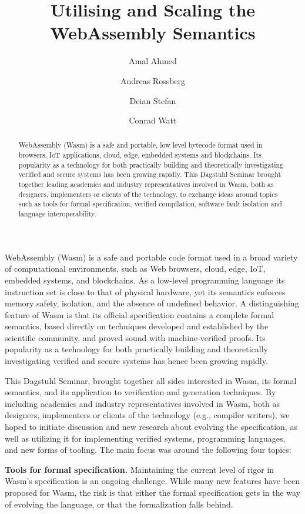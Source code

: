 \documentclass[a4paper,UKenglish]{dagrep-v2018}
\title{Utilising and Scaling the WebAssembly Semantics}
\author[1]{Amal Ahmed}
\author[2]{Andreas Rossberg}
\author[3]{Deian Stefan}
\author[4]{Conrad Watt}
\affil[1]{Northeastern University - Boston, US, \texttt{amal@ccs.neu.edu}}
\affil[2]{München, DE, \texttt{rossberg@mpi-sws.org}}
\affil[3]{University of California - San Diego, US, \texttt{deian@cs.ucsd.edu}}
\affil[4]{Nanyang TU - Singapore, SG, \texttt{conrad.watt@cl.cam.ac.uk}}
\begin{document}
\maketitle

\begin{abstract}
WebAssembly (Wasm) is a safe and portable, low level bytecode format used in browsers, IoT applications, cloud, edge, embedded systems and blockchains. Its popularity as a technology for both practically building and theoretically investigating verified and secure systems has been growing rapidly. This Dagstuhl Seminar brought together leading academics and industry representatives involved in Wasm, both as designers, implementers or clients of the technology, to exchange ideas around topics such as tools for formal specification, verified compilation, software fault isolation and language interoperability. 
\end{abstract}

\license
{}

WebAssembly (Wasm) is a safe and portable code format used in a broad variety of computational environments, such as Web browsers, cloud, edge, IoT, embedded systems, and blockchains. As a low-level programming language its instruction set is close to that of physical hardware, yet its semantics enforces memory safety, isolation, and the absence of undefined behavior. A distinguishing feature of Wasm is that its official specification contains a complete formal semantics, based directly on techniques developed and established by the scientific community, and proved sound with machine-verified proofs. Its popularity as a technology for both practically building and theoretically investigating verified and secure systems has hence been growing rapidly.

This Dagstuhl Seminar, brought together all sides interested in Wasm, its formal semantics, and its application to verification and generation techniques. By including academics and industry representatives involved in Wasm, both as designers, implementers or clients of the technology (e.g., compiler writers), we hoped to initiate discussion and new research about evolving the specification, as well as utilizing it for implementing verified systems, programming languages, and new forms of tooling. The main focus was around the following four topics: 

\textbf{Tools for formal specification.} Maintaining the current level of rigor in Wasm's specification is an ongoing challenge. While many new features have been proposed for Wasm, the risk is that either the formal specification gets in the way of evolving the language, or that the formalization falls behind.
\end{document}
